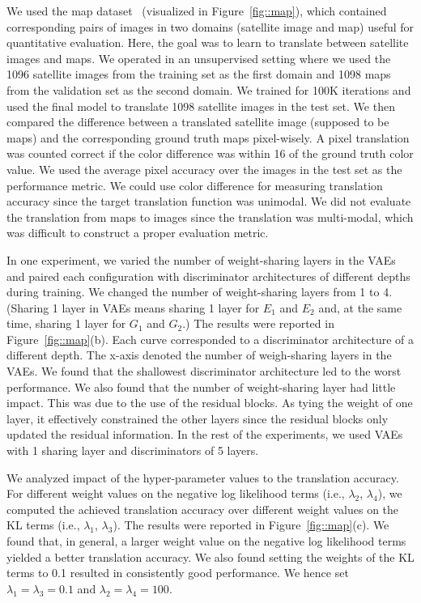 \documentclass{article}
\begin{document}
We used the map dataset~\cite{isola2016image} (visualized in Figure~\ref{fig::map}), which contained corresponding pairs of images in two domains (satellite image and map) useful for quantitative evaluation. Here, the goal was to learn to translate between satellite images and maps. We operated in an unsupervised setting where we used the 1096 satellite images from the training set as the first domain and 1098 maps from the validation set as the second domain. We trained for 100K iterations and used the final model to translate 1098 satellite images in the test set. We then compared the difference between a translated satellite image (supposed to be maps) and the corresponding ground truth maps pixel-wisely. A pixel translation was counted correct if the color difference was within 16 of the ground truth color value. We used the average pixel accuracy over the images in the test set as the performance metric. We could use color difference for measuring translation accuracy since the target translation function was unimodal. We did not evaluate the translation from maps to images since the translation was multi-modal, which was difficult to construct a proper evaluation metric.

In one experiment, we varied the number of weight-sharing layers in the VAEs and paired each configuration with discriminator architectures of different depths during training. We changed the number of weight-sharing layers from 1 to 4. (Sharing 1 layer in VAEs means sharing 1 layer for $E_1$ and $E_2$ and, at the same time, sharing 1 layer for $G_1$ and $G_2$.) The results were reported in Figure~\ref{fig::map}(b). Each curve corresponded to a discriminator architecture of a different depth. The x-axis denoted the number of weigh-sharing layers in the VAEs. We found that the shallowest discriminator architecture led to the worst performance. We also found that the number of weight-sharing layer had little impact. This was due to the use of the residual blocks. As tying the weight of one layer, it effectively constrained the other layers since the residual blocks only updated the residual information. In the rest of the experiments, we used VAEs with 1 sharing layer and discriminators of 5 layers.

We analyzed impact of the hyper-parameter values to the translation accuracy. For different weight values on the negative log likelihood terms (i.e., $\lambda_2$, $\lambda_4$), we computed the achieved translation accuracy over different weight values on the KL terms (i.e., $\lambda_1$, $\lambda_3$). The results were reported in Figure~\ref{fig::map}(c). We found that, in general, a larger weight value on the negative log likelihood terms yielded a better translation accuracy. We also found setting the weights of the KL terms to 0.1 resulted in consistently good performance. We hence set $\lambda_1=\lambda_3=0.1$ and $\lambda_2=\lambda_4=100$.
\end{document}
